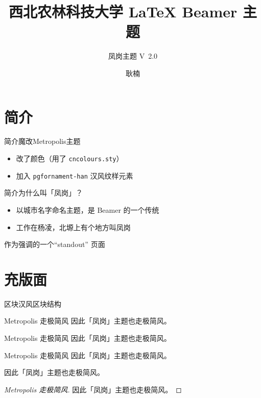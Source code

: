 \documentclass[fontset = none, t, aspectratio=169]{ctexbeamer}
\title[凤岗主题]{\Large 西北农林科技大学 {\LaTeX}  Beamer 主题}
\subtitle{凤岗主题 V\ 2.0}
\author[N. Geng]{耿楠}
\date{\tosemester} %
\institute[信息学院]{\nwafu\cie}
\begin{document}
\begin{frame}[plain]
  \maketitle
\end{frame}

\section{简介}

\begin{frame}{简介}{魔改Metropolis主题}
  \begin{itemize}
    \item 改了颜色（用了 \texttt{cncolours.sty}）
    \item 加入 \texttt{pgfornament-han} 汉风纹样元素
  \end{itemize}
\end{frame}

\begin{frame}{简介}{为什么叫「凤岗」？}
  \begin{itemize}
    \item 以城市名字命名主题，是 Beamer 的一个传统
    \item 工作在杨凌，北塬上有个地方叫\alert{凤岗}
  \end{itemize}
\end{frame}

\begin{frame}
作为强调的一个\enquote{standout} 页面
\end{frame}

\section{充版面}

\begin{frame}[allowframebreaks]{区块}{汉风区块结构}

  \begin{block}{Metropolis 走极简风}
    因此「凤岗」主题也走极简风。
  \end{block}

  \begin{exampleblock}{Metropolis 走极简风}
    因此「凤岗」主题也走极简风。
  \end{exampleblock}

  \begin{alertblock}{Metropolis 走极简风}
    因此「凤岗」主题也走极简风。
  \end{alertblock}

  \begin{theorem}
    因此「凤岗」主题也走极简风。
  \end{theorem}

  \begin{proof}[Metropolis 走极简风]
    因此「凤岗」主题也走极简风。
  \end{proof}
\end{frame}
\end{document}
